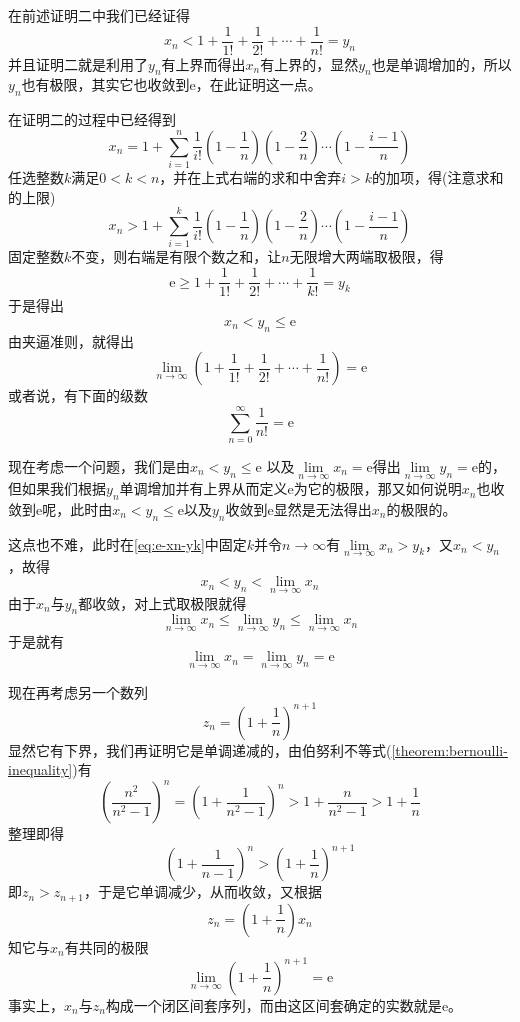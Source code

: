 在前述证明二中我们已经证得
\[ x_n < 1 + \frac{1}{1!} + \frac{1}{2!} + \cdots + \frac{1}{n!} = y_n \]
并且证明二就是利用了$y_n$有上界而得出$x_n$有上界的，显然$y_n$也是单调增加的，所以$y_n$也有极限，其实它也收敛到$\mathrm{e}$，在此证明这一点。

在证明二的过程中已经得到
\[ x_n = 1 + \sum_{i=1}^n \frac{1}{i!}\left( 1-\frac{1}{n} \right) \left( 1-\frac{2}{n} \right) \cdots \left( 1-\frac{i-1}{n} \right) \]
任选整数$k$满足$0<k<n$，并在上式右端的求和中舍弃$i>k$的加项，得(注意求和的上限)
\begin{equation}\label{eq:e-xn-yk}
 x_n > 1 + \sum_{i=1}^k \frac{1}{i!}\left( 1-\frac{1}{n} \right) \left( 1-\frac{2}{n} \right) \cdots \left( 1-\frac{i-1}{n} \right) 
\end{equation}
固定整数$k$不变，则右端是有限个数之和，让$n$无限增大两端取极限，得
\[ \mathrm{e} \geqslant 1 + \frac{1}{1!} + \frac{1}{2!} + \cdots + \frac{1}{k!} = y_k \]
于是得出
\[ x_n < y_n \leqslant \mathrm{e} \]
由夹逼准则，就得出
\[ \lim_{n \to \infty} \left( 1 + \frac{1}{1!} + \frac{1}{2!} + \cdots + \frac{1}{n!} \right) = \mathrm{e} \]
或者说，有下面的级数
\begin{equation}
  \label{eq:series-1-devide-by-n-fractor-is-e}
 \sum_{n=0}^{\infty} \frac{1}{n!} = \mathrm{e} 
\end{equation}

现在考虑一个问题，我们是由$x_n<y_n \leqslant \mathrm{e}$ 以及$\lim\limits_{n \to \infty} x_n = \mathrm{e}$得出$\lim\limits_{n \to \infty} y_{n}=\mathrm{e}$的，但如果我们根据$y_n$单调增加并有上界从而定义$\mathrm{e}$为它的极限，那又如何说明$x_n$也收敛到$\mathrm{e}$呢，此时由$x_n<y_n\leqslant \mathrm{e}$以及$y_n$收敛到$\mathrm{e}$显然是无法得出$x_n$的极限的。

这点也不难，此时在\autoref{eq:e-xn-yk}中固定$k$并令$n\to\infty$有$\lim\limits_{n \to \infty} x_n > y_k$，又$x_n<y_n$，故得
\[ x_n < y_n < \lim_{n \to \infty} x_n \]
由于$x_n$与$y_n$都收敛，对上式取极限就得
\[ \lim_{n \to \infty} x_n \leqslant \lim_{n \to \infty}y_n \leqslant \lim_{n \to \infty} x_n \]
于是就有
\[ \lim_{n \to \infty} x_n = \lim_{n \to \infty} y_n = \mathrm{e} \]

现在再考虑另一个数列
\[ z_n = \left( 1 + \frac{1}{n} \right)^{n+1} \]
显然它有下界，我们再证明它是单调递减的，由伯努利不等式(\autoref{theorem:bernoulli-inequality})有
\[ \left( \frac{n^2}{n^2-1} \right)^n = \left( 1 + \frac{1}{n^2-1} \right)^n > 1 + \frac{n}{n^2-1} > 1 + \frac{1}{n} \]
整理即得
\[ \left( 1 + \frac{1}{n-1} \right)^n > \left( 1+ \frac{1}{n} \right)^{n+1} \]
即$z_n>z_{n+1}$，于是它单调减少，从而收敛，又根据
\[ z_n=\left( 1+\frac{1}{n} \right)x_n \]
知它与$x_n$有共同的极限
\[ \lim_{n \to \infty} \left( 1 + \frac{1}{n} \right)^{n+1} = \mathrm{e} \]
事实上，$x_n$与$z_n$构成一个闭区间套序列，而由这区间套确定的实数就是$\mathrm{e}$。

